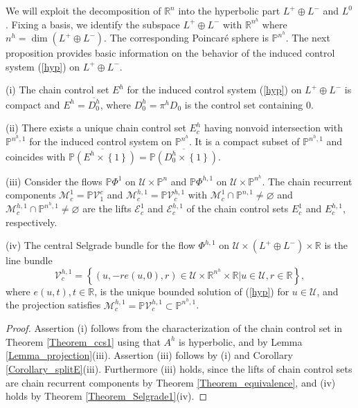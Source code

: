 \documentclass{siamltex}%
\begin{document}
We will exploit the decomposition of $\mathbb{R}^{n}$ into the hyperbolic part
$L^{+}\oplus L^{-}$ and $L^{0}$. Fixing a basis, we identify the subspace
$L^{+}\oplus L^{-}$ with $\mathbb{R}^{n^{h}}$ where $n^{h}=\dim(L^{+}\oplus
L^{-})$. The corresponding Poincar\'{e} sphere is $\mathbb{P}^{n^{h}}$. The
next proposition provides basic information on the behavior of the induced
control system (\ref{hyp}) on $L^{+}\oplus L^{-}$.

\begin{proposition}
\label{Proposition_hyp1}(i) The chain control set $E^{h}$ for the induced
control system (\ref{hyp}) on $L^{+}\oplus L^{-}$ is compact and
$E^{h}=\overline{D_{0}^{h}}$, where $D_{0}^{h}=\pi^{h}D_{0}$ is the control
set containing $0.$

(ii) There exists a unique chain control set $E_{c}^{h}$ having nonvoid
intersection with $\mathbb{P}^{n^{h},1}$ for the induced control system on
$\mathbb{P}^{n^{h}}$. It is a compact subset of $\mathbb{P}^{n^{h},1}$ and
coincides with $\overline{\mathbb{P}\left(  E^{h}\times\left\{  1\right\}
\right)  }=\overline{\mathbb{P}\left(  D_{0}^{h}\times\left\{  1\right\}
\right)  }$.

(iii) Consider the flows $\mathbb{P}\Phi^{1}$ on $\mathcal{U}\times
\mathbb{P}^{n}$ and $\mathbb{P}\Phi^{h,1}$ on $\mathcal{U}\times
\mathbb{P}^{n^{h}}$. The chain recurrent components $\mathcal{M}_{c}%
^{1}=\mathbb{P}\mathcal{V}_{1}^{c}$ and $\mathcal{M}_{c}^{h,1}=\mathbb{P}%
\mathcal{V}_{c}^{h,1}$ with $\mathcal{M}_{c}^{1}\cap\mathbb{P}^{n,1}%
\not =\varnothing$ and $\mathcal{M}_{c}^{h,1}\cap\mathbb{P}^{n^{h},1}%
\not =\varnothing$ are the lifts $\mathcal{E}_{c}^{1}$ and $\mathcal{E}%
_{c}^{h,1}$ of the chain control sets $E_{c}^{1}$ and $E_{c}^{h,1}$, respectively.

(iv) The central Selgrade bundle for the flow $\Phi^{h,1}$ on $\mathcal{U}%
\times\left(  L^{+}\oplus L^{-}\right)  \times\mathbb{R}$ is the line bundle%
\[
\mathcal{V}_{c}^{h,1}=\left\{  (u,-re(u,0),r)\in\mathcal{U}\times
\mathbb{R}^{n^{h}}\times\mathbb{R}\left\vert u\in\mathcal{U},r\in
\mathbb{R}\right.  \right\}  ,
\]
where $e(u,t),t\in\mathbb{R}$, is the unique bounded solution of (\ref{hyp})
for $u\in\mathcal{U}$, and the projection satisfies $\mathcal{M}_{c}%
^{h,1}=\mathbb{P}\mathcal{V}_{c}^{h,1}\subset\mathbb{P}^{n^{h},1}$.
\end{proposition}

\begin{proof}
Assertion (i) follows from the characterization of the chain control set in
Theorem \ref{Theorem_ccs1} using that $A^{h}$ is hyperbolic, and by Lemma
\ref{Lemma_projection}(iii). Assertion (iii) follows by (i) and Corollary
\ref{Corollary_splitE}(iii). Furthermore (iii) holds, since the lifts of chain
control sets are chain recurrent components by Theorem
\ref{Theorem_equivalence}, and (iv) holds by Theorem \ref{Theorem_Selgrade1}(iv).
\end{proof}
\end{document}
